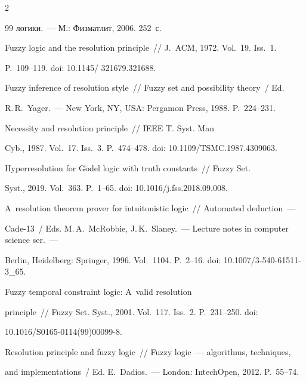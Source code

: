\begin{multicols}{2}
{{\begin{thebibliography}{99}
логики.~--- М.: Физматлит, 2006. 252~с.




 Fuzzy logic and the resolution principle~// J.~ACM, 1972. Vol.~19. Iss.~1. 


P.~109--119. doi: 10.1145/ 321679.321688.




 Fuzzy inference of resolution style~// Fuzzy set and possibility theory~/ Ed. 


R.\,R.~Yager.~--- New York, NY, USA: Pergamon Press, 1988. P.~224--231.




 Necessity and resolution principle~// IEEE T. Syst. Man  


Cyb., 1987. Vol.~17. Iss.~3. P.~474--478. doi: 10.1109/TSMC.1987.4309063.




 Hyperresolution for G$\ddot{\mbox{o}}$del logic with truth constants~// Fuzzy Set. 


Syst., 2019. Vol.~363. P.~1--65. doi: 10.1016/j.fss.2018.09.008.










 A~resolution theorem prover for intuitonistic logic~// Automated deduction~--- 


Cade-13~/ Eds. M.\,A.~McRobbie, J.\,K.~Slaney.~--- Lecture notes in computer science ser.~--- 


Berlin, Heidelberg: Springer, 1996. Vol.~1104. P.~2--16. doi: 10.1007/3-540-61511-3\_65.




 Fuzzy temporal constraint logic: A~valid resolution 


principle~// Fuzzy Set. Syst., 2001. Vol.~117. Iss.~2. P.~231--250. doi:  


10.1016/S0165-0114(99)00099-8.







 Resolution principle and fuzzy logic~// Fuzzy logic~--- algorithms, techniques, 


and implementations~/ Ed. E.~Dadios.~--- London: IntechOpen, 2012. P.~55--74.






\end{thebibliography}}}
\end{multicols}
